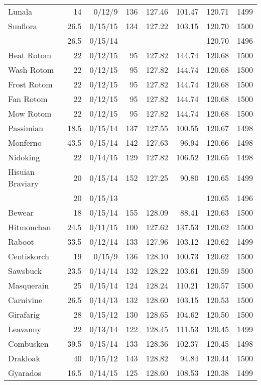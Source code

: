 \begin{longtable}{lrrrrrrr}
Lunala & 14 & 0/12/9 & 136 & 127.46 & 101.47 & 120.71 & 1499\\
Sunflora & 26.5 & 0/15/15 & 134 & 127.22 & 103.15 & 120.70 & 1500\\
 & 26.5 & 0/15/14 & & & & 120.70 & 1496\\
Heat Rotom & 22 & 0/12/15 & 95 & 127.82 & 144.74 & 120.68 & 1500\\
Wash Rotom & 22 & 0/12/15 & 95 & 127.82 & 144.74 & 120.68 & 1500\\
Frost Rotom & 22 & 0/12/15 & 95 & 127.82 & 144.74 & 120.68 & 1500\\
Fan Rotom & 22 & 0/12/15 & 95 & 127.82 & 144.74 & 120.68 & 1500\\
Mow Rotom & 22 & 0/12/15 & 95 & 127.82 & 144.74 & 120.68 & 1500\\
Passimian & 18.5 & 0/15/14 & 137 & 127.55 & 100.55 & 120.67 & 1498\\
Monferno & 43.5 & 0/15/14 & 142 & 127.63 & 96.94 & 120.66 & 1498\\
Nidoking & 22 & 0/14/15 & 129 & 127.82 & 106.52 & 120.65 & 1498\\
Hisuian Braviary & 20 & 0/15/14 & 152 & 127.25 & 90.80 & 120.65 & 1499\\
 & 20 & 0/15/13 & & & & 120.65 & 1496\\
Bewear & 18 & 0/15/14 & 155 & 128.09 & 88.41 & 120.63 & 1500\\
Hitmonchan & 24.5 & 0/11/15 & 100 & 127.62 & 137.53 & 120.62 & 1500\\
Raboot & 33.5 & 0/12/14 & 133 & 127.96 & 103.12 & 120.62 & 1499\\
Centiskorch & 19 & 0/15/9 & 136 & 128.10 & 100.73 & 120.62 & 1500\\
Sawsbuck & 23.5 & 0/14/14 & 132 & 128.22 & 103.61 & 120.59 & 1500\\
Masquerain & 25 & 0/15/14 & 124 & 128.24 & 110.21 & 120.57 & 1500\\
Carnivine & 26.5 & 0/14/13 & 132 & 128.60 & 103.15 & 120.53 & 1500\\
Girafarig & 28 & 0/15/12 & 130 & 128.65 & 104.62 & 120.50 & 1500\\
Leavanny & 22 & 0/13/14 & 122 & 128.45 & 111.53 & 120.45 & 1499\\
Combusken & 39.5 & 0/15/14 & 133 & 128.36 & 102.37 & 120.45 & 1498\\
Drakloak & 40 & 0/15/12 & 143 & 128.82 & 94.84 & 120.44 & 1500\\
Gyarados & 16.5 & 0/14/15 & 125 & 128.60 & 108.53 & 120.38 & 1499\\

\end{longtable}
